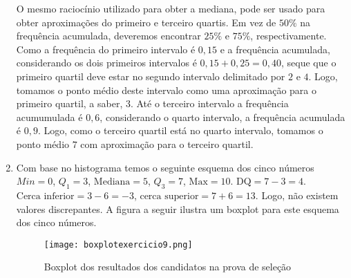 \documentclass[10 pt,usenames,dvipsnames, oneside]{article}
\begin{document}
\begin{solucao}
\begin{enumerate}
O mesmo raciocínio utilizado para obter a mediana, pode ser usado para obter aproximações do primeiro e terceiro quartis. Em vez de $50\%$ na frequência acumulada, deveremos encontrar $25\%$ e $75\%$, respectivamente. Como a frequência do primeiro intervalo é $0{,}15$ e a frequência acumulada, considerando os dois primeiros intervalos é $0{,}15+0{,}25=0{,}40$, seque que o primeiro quartil deve estar no segundo intervalo delimitado por $2$ e $4$. Logo, tomamos o ponto médio deste intervalo como uma aproximação para o primeiro quartil, a saber, 3. Até o terceiro intervalo a frequência acumumulada é $0{,}6$, considerando o quarto intervalo, a frequência acumulada é $0{,}9$. Logo, como o terceiro quartil está no quarto intervalo, tomamos o ponto médio $7$ com aproximação para o terceiro quartil.

\item Com base no histograma temos o seguinte esquema dos cinco números $Min=0$, $Q_1=3$, $\text{Mediana}=5$, $Q_3=7$, $\text{Max}=10$. $\text{DQ}=7-3=4$. $\text{Cerca inferior}=3-6=-3$, $\text{cerca superior}=7+6=13$. Logo, não existem valores discrepantes. A figura a seguir ilustra um boxplot para este esquema dos cinco números.
\begin{figure}[H]
\centering

\texttt{[image: boxplotexercicio9.png]}
\caption{Boxplot dos resultados dos candidatos na prova de seleção}
\label{}
\end{figure}
\end{enumerate}

\end{solucao}
\fi
\end{document}
